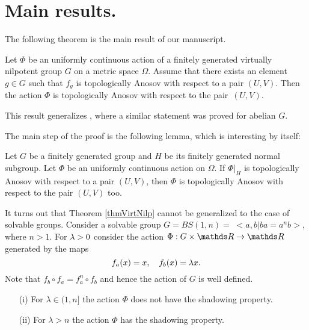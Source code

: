 \section{Main results.}

The following theorem is the main result of our manuscript.

\begin{thm}\label{thmVirtNilp}
Let $\Phi$ be an uniformly continuous action of a finitely generated virtually nilpotent group $G$ on a metric space $\Omega$. Assume that there exists an element $g \in G$ such that $f_g$ is topologically Anosov with respect to a pair $(U, V)$.
Then the action $\Phi$ is topologically Anosov with respect to the pair~$(U, V)$.
\end{thm}

\begin{remark} This result generalizes \cite{PilTikh}, where a similar statement was proved for abelian $G$.
\end{remark}

The main step of the proof is the following lemma, which is interesting by itself:
\begin{lem}\label{lemNormSubgroup}
Let $G$ be a finitely generated group and $H$ be its finitely generated normal subgroup. Let $\Phi$ be an uniformly continuous action on $\Omega$. If $\Phi|_H$ is topologically Anosov with respect to a pair $(U, V)$, then $\Phi$ is topologically Anosov with respect to the pair $(U, V)$ too.
\end{lem}

It turns out that Theorem \ref{thmVirtNilp} cannot be generalized to the case of solvable groups. Consider a solvable group $G = BS(1, n) = \; <a, b| ba = a^nb>$, where $n > 1$. For $\lambda >0$ consider the action $\Phi: G \times \RR \to \RR$ generated by the maps
$$
f_a(x) = x, \quad f_b(x) = \lambda x.
$$
Note that $f_b \circ f_a = f_a^n \circ f_b$ and hence the action of $G$ is well defined.


\begin{thm}
\label{ThBS}
\begin{itemize}
  \item[(i)] For $\lambda \in (1, n]$ the action $\Phi$ does not have the shadowing property.
  \item[(ii)] For $\lambda > n$ the action $\Phi$ has the shadowing property.
\end{itemize}
\end{thm}

